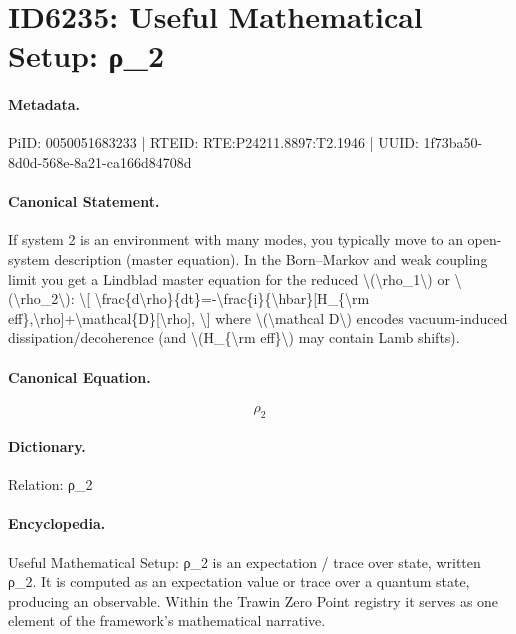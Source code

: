 \section*{ID6235: Useful Mathematical Setup: ρ\_2}
\paragraph{Metadata.}
PiID: 0050051683233 | RTEID: RTE:P24211.8897:T2.1946 | UUID: 1f73ba50-8d0d-568e-8a21-ca166d84708d

\paragraph{Canonical Statement.}
If system 2 is an environment with many modes, you typically move to an open-system description (master equation). In the Born–Markov and weak coupling limit you get a Lindblad master equation for the reduced \textbackslash{}(\textbackslash{}rho\_1\textbackslash{}) or \textbackslash{}(\textbackslash{}rho\_2\textbackslash{}): \textbackslash{}[ \textbackslash{}frac\{d\textbackslash{}rho\}\{dt\}=-\textbackslash{}frac\{i\}\{\textbackslash{}hbar\}[H\_\{\textbackslash{}rm eff\},\textbackslash{}rho]+\textbackslash{}mathcal\{D\}[\textbackslash{}rho], \textbackslash{}] where \textbackslash{}(\textbackslash{}mathcal D\textbackslash{}) encodes vacuum-induced dissipation/decoherence (and \textbackslash{}(H\_\{\textbackslash{}rm eff\}\textbackslash{}) may contain Lamb shifts).

\paragraph{Canonical Equation.}
\[
\rho_2
\]

\paragraph{Dictionary.}
Relation: ρ\_2

\paragraph{Encyclopedia.}
Useful Mathematical Setup: ρ\_2 is an expectation / trace over state, written ρ\_2. It is computed as an expectation value or trace over a quantum state, producing an observable. Within the Trawin Zero Point registry it serves as one element of the framework's mathematical narrative.
